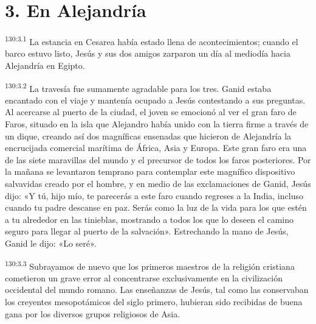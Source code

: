 \section*{3. En Alejandría}
\par
\textsuperscript{130:3.1} La estancia en Cesarea había estado llena de acontecimientos; cuando el barco estuvo listo, Jesús y sus dos amigos zarparon un día al mediodía hacia Alejandría en Egipto.

\par
\textsuperscript{130:3.2} La travesía fue sumamente agradable para los tres. Ganid estaba encantado con el viaje y mantenía ocupado a Jesús contestando a sus preguntas. Al acercarse al puerto de la ciudad, el joven se emocionó al ver el gran faro de Faros, situado en la isla que Alejandro había unido con la tierra firme a través de un dique, creando así dos magníficas ensenadas que hicieron de Alejandría la encrucijada comercial marítima de África, Asia y Europa. Este gran faro era una de las siete maravillas del mundo y el precursor de todos los faros posteriores. Por la mañana se levantaron temprano para contemplar este magnífico dispositivo salvavidas creado por el hombre, y en medio de las exclamaciones de Ganid, Jesús dijo: «Y tú, hijo mío, te parecerás a este faro cuando regreses a la India, incluso cuando tu padre descanse en paz. Serás como la luz de la vida para los que estén a tu alrededor en las tinieblas, mostrando a todos los que lo deseen el camino seguro para llegar al puerto de la salvación». Estrechando la mano de Jesús, Ganid le dijo: «Lo seré».

\par
\textsuperscript{130:3.3} Subrayamos de nuevo que los primeros maestros de la religión cristiana cometieron un grave error al concentrarse exclusivamente en la civilización occidental del mundo romano. Las enseñanzas de Jesús, tal como las conservaban los creyentes mesopotámicos del siglo primero, hubieran sido recibidas de buena gana por los diversos grupos religiosos de Asia.

